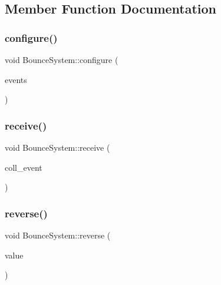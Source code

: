 \subsection{Member Function Documentation}
\mbox{\label{classBounceSystem_a64c3ae9db2a670af61b47be39c4fb353}} 
\subsubsection{\texorpdfstring{configure()}{configure()}}
{\footnotesize\ttfamily void Bounce\+System\+::configure (\begin{DoxyParamCaption}\item[{ex\+::\+Event\+Manager \&}]{events }\end{DoxyParamCaption})\hspace{0.3cm}{\ttfamily [override]}}

\mbox{\label{classBounceSystem_a26bcb419f819afb3c4a19364585c72a3}} 
\subsubsection{\texorpdfstring{receive()}{receive()}}
{\footnotesize\ttfamily void Bounce\+System\+::receive (\begin{DoxyParamCaption}\item[{const \hyperlink{structCollisionEvent}{Collision\+Event} \&}]{coll\+\_\+event }\end{DoxyParamCaption})}

\mbox{\label{classBounceSystem_ae7fdd15d7e5dffed1ec3fa997cc64e8f}} 
\subsubsection{\texorpdfstring{reverse()}{reverse()}}
{\footnotesize\ttfamily void Bounce\+System\+::reverse (\begin{DoxyParamCaption}\item[{float \&}]{value }\end{DoxyParamCaption})\hspace{0.3cm}{\ttfamily [static]}}

